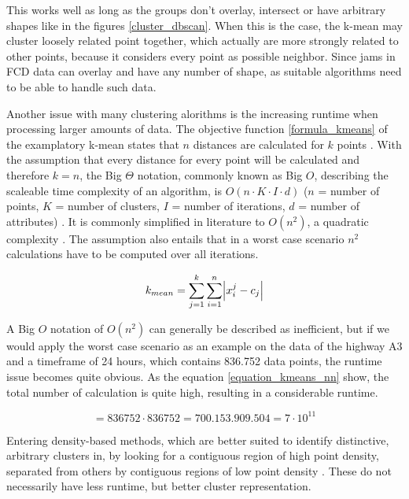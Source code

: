 \documentclass[a4paper,headsepline,footsepline,fontsize=11pt,BCOR=12mm,DIV=12]{report}
\begin{document}
This works well as long as the groups don't overlay, intersect or have arbitrary shapes like in the figures \ref{cluster_dbscan}. When this is the case, the k-mean may cluster loosely related point together, which actually are more strongly related to other points, because it considers every point as possible neighbor. Since jams in FCD data can overlay and have any number of shape, as suitable algorithms need to be able to handle such data.

Another issue with many clustering alorithms is the increasing runtime when processing larger amounts of data. The objective function \ref{formula_kmeans} of the examplatory k-mean states that $n$ distances are calculated for $k$ points \cite{Santhanam2010}. With the assumption that every distance for every point will be calculated and therefore $k=n$, the Big $\Theta$ notation, commonly known as Big $O$, describing the scaleable time complexity of an algorithm, is $O(n \cdot K \cdot I \cdot d)$ ($n$ = number of points, $K$ = number of clusters, $I$ = number of iterations, $d$ = number of attributes) \cite{Dalatu2016}. It is commonly simplified in literature to $O(n^2)$, a quadratic complexity \cite{Pakhira2014}. The assumption also entails that in a worst case scenario $n^2$ calculations have to be computed over all iterations.

\begin{equation}
\label{formula_kmeans}
	k_{mean} =  \sum_{j=1}^k{\sum_{i=1}^n{\abs{x_i^j-c_j}}}
\end{equation}

\bigskip

A Big $O$ notation of $O(n^2)$ can generally be described as inefficient, but if we would apply the worst case scenario as an example on the data of the highway A3 and a timeframe of 24 hours, which contains 836.752 data points, the runtime issue becomes quite obvious. As the equation \ref{equation_kmeans_nn} show, the total number of calculation is quite high, resulting in a considerable runtime. \cite{Busch2004}

\begin{equation}
\label{equation_kmeans_nn}
	 = 836752 \cdot 836752 = 700.153.909.504 = 7 \cdot 10^{11}
\end{equation}

\bigskip

Entering density-based methods, which are better suited to identify distinctive, arbitrary clusters in, by looking for a contiguous region of high point density, separated from others by contiguous regions of low point density \cite{Chauhan2020}. These do not necessarily have less runtime, but better cluster representation.
\end{document}
